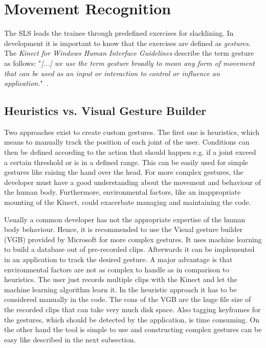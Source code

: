 \section{Movement Recognition}\label{5_3_movementRecognition}
The SLS leads the trainee through predefined exercises for slacklining. In development it is important to know that the exercises are defined as \textit{gestures}. The \textit{Kinect for Windows Human Interface Guidelines} describe the term gesture as follows: "\textit{[...] we use the term gesture broadly to mean any form of movement that can be used as an input or interaction to control or influence an application.}"~\cite{MicrosoftHIG2014-mh}.


\subsection{Heuristics vs. Visual Gesture Builder}

Two approaches exist to create custom gestures.
The first one is heuristics, which means to manually track the position of each joint of the user.
Conditions can then be defined according to the action that should happen e.g. if a joint exceed a certain threshold or is in a defined range.
This can be easily used for simple gestures like raising the hand over the head.
For more complex gestures, the developer must have a good understanding about the movement and behaviour of the human body.
Furthermore, environmental factors, like an inappropriate mounting of the Kinect, could exacerbate managing and maintaining the code.

Usually a common developer has not the appropriate expertise of the human body behaviour.
Hence, it is recommended to use the Visual gesture builder (VGB) provided by Microsoft for more complex gestures.
It uses machine learning to build a database out of pre-recorded clips.
Afterwards it can be implemented in an application to track the desired gesture.
A major advantage is that environmental factors are not as complex to handle as in comparison to heuristics. The user just records multiple clips with the Kinect and let the machine learning algorithm learn it.
In the heuristic approach it has to be considered manually in the code.
The cons of the VGB are the huge file size of the recorded clips that can take very much disk space.
Also tagging keyframes for the gestures, which should be detected by the application, is time consuming. 
On the other hand the tool is simple to use and constructing complex gestures can be easy like described in the next subsection.


